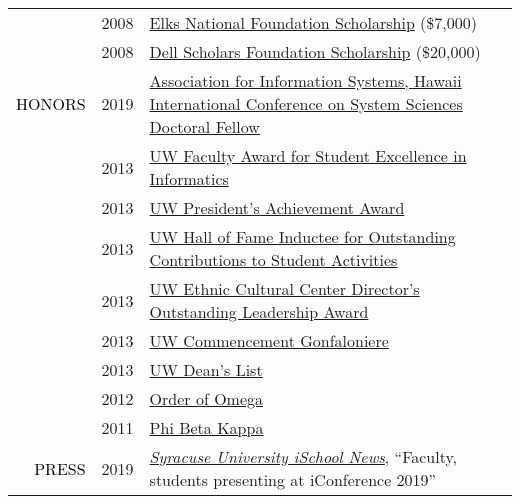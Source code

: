 \documentclass[12pt]{article}
\begin{document}
{{\begin{longtable}{Rp{1.0in}p{0.25in}p{4.75in}}
& \footnotesize{2008} & \href{http://www.elks.org/enf/scholars/}{{Elks National Foundation Scholarship}} (\$7,000) \\

& \footnotesize{2008} & \href{https://www.dellscholars.org/}{{Dell Scholars Foundation Scholarship}} (\$20,000) \\

\textcolor{black}{\footnotesize{\uppercase{Honors}}} & \footnotesize{2019} & \href{https://twitter.com/bdosono/status/1082439167512961024}{{Association for Information Systems, Hawaii International Conference on System Sciences Doctoral Fellow}} \\

& \footnotesize{2013} & \href{https://ischool.uw.edu/feature-stories/2013-ischool-convocation-celebrates-achievement-and-community}{{UW Faculty Award for Student Excellence in Informatics}} \\

& \footnotesize{2013} & \href{http://www.washington.edu/omad/celebration/recognition-scholarship-recipients/2013-celebration-scholarship-recipients/}{{UW President’s Achievement Award}} \\

& \footnotesize{2013} & \href{http://depts.washington.edu/thehub/hub-events/hub-awards/}{{UW Hall of Fame Inductee for Outstanding Contributions to Student Activities}} \\

& \footnotesize{2013} & \href{https://www.facebook.com/EthnicCulturalCenter/photos/a.10151638127531422.1073741830.124987626421/10151638128881422/}{{UW Ethnic Cultural Center Director’s Outstanding Leadership Award}} \\

& \footnotesize{2013} & \href{https://www.facebook.com/UWiSchool/posts/10151645734368695}{{UW Commencement Gonfaloniere}} \\

& \footnotesize{2013} & \href{https://www.yakimaherald.com/news/education/school-news-sept/article_af5885a3-bcbc-5925-bb87-a84844c6d36a.html}{{UW Dean’s List}} \\

& \footnotesize{2012} & \href{http://orderofomega.org/}{{Order of Omega}} \\

& \footnotesize{2011} & \href{https://www.pbk.org/}{{Phi Beta Kappa}} \\

\textcolor{black}{\footnotesize{\uppercase{Press}}} & \footnotesize{2019} & \href{https://ischool.syr.edu/articles/news/view/faculty-students-presenting-at-iconference-2019/}{\textit{{Syracuse University iSchool News}}}, ``Faculty, students presenting at iConference 2019'' \\


\end{longtable}}}
\end{document}
